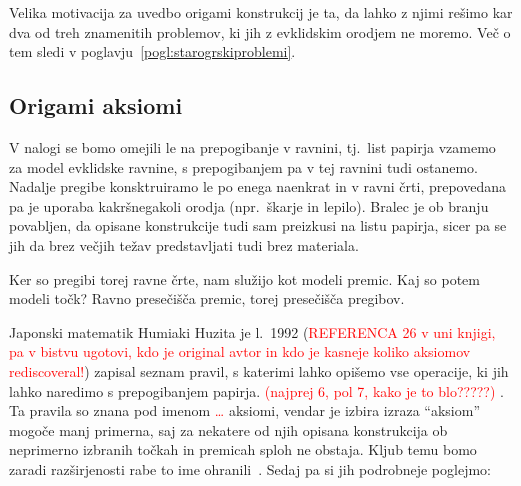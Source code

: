 Velika motivacija za uvedbo origami konstrukcij je ta, da lahko z njimi rešimo kar dva od treh znamenitih problemov, ki jih z evklidskim orodjem ne moremo. Več o tem sledi v poglavju~\ref{pogl:starogrskiproblemi}.

\subsection{Origami aksiomi}

V nalogi se bomo omejili le na prepogibanje v ravnini, tj.\ list papirja vzamemo za model evklidske ravnine, s prepogibanjem pa v tej ravnini tudi ostanemo. Nadalje pregibe konsktruiramo le po enega naenkrat in v ravni črti, prepovedana pa je uporaba kakršnegakoli orodja (npr.\ škarje in lepilo).  Bralec je ob branju povabljen, da opisane konstrukcije tudi sam preizkusi na listu papirja, sicer pa se jih da brez večjih težav predstavljati tudi brez materiala.

Ker so pregibi torej ravne črte, nam služijo kot modeli premic. Kaj so potem modeli točk? Ravno presečišča premic, torej presečišča pregibov.

Japonski matematik Humiaki Huzita je l.\ 1992 (\textcolor{red}{REFERENCA 26 v uni knjigi, pa v bistvu ugotovi, kdo je original avtor in kdo je kasneje koliko aksiomov rediscoveral!}) zapisal seznam pravil, s katerimi lahko opišemo vse operacije, ki jih lahko naredimo s prepogibanjem papirja. \textcolor{red}{(najprej 6, pol 7, kako je to blo?????)}
. Ta pravila so znana pod imenom \textcolor{red}{\ldots} aksiomi, vendar je izbira izraza ``aksiom'' mogoče manj primerna, saj za nekatere od njih opisana konstrukcija ob neprimerno izbranih točkah in premicah sploh ne obstaja. Kljub temu bomo zaradi razširjenosti rabe to ime ohranili~\cite[str.\ 7]{zore2022}. Sedaj pa si jih podrobneje poglejmo:

